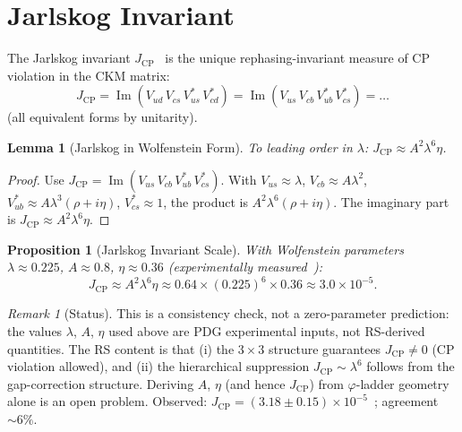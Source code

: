 \documentclass[12pt,a4paper]{article}
\newtheorem{lemma}[theorem]{Lemma}
\newtheorem{proposition}[theorem]{Proposition}
\theoremstyle{definition}
\theoremstyle{remark}
\newtheorem{remark}[theorem]{Remark}
\begin{document}
\section{Jarlskog Invariant}
\label{sec:jarlskog}

The Jarlskog invariant $J_{\mathrm{CP}}$~\cite{Jarlskog1985} is the
unique rephasing-invariant measure of CP violation in the CKM matrix:
\begin{equation}
  J_{\mathrm{CP}} = \operatorname{Im}(V_{ud}\,V_{cs}\,V_{us}^*\,V_{cd}^*)
  = \operatorname{Im}(V_{us}\,V_{cb}\,V_{ub}^*\,V_{cs}^*)
  = \dots
\end{equation}
(all equivalent forms by unitarity).

\begin{lemma}[Jarlskog in Wolfenstein Form]
\label{lem:jarlskog-wolf}
To leading order in $\lambda$:
$J_{\mathrm{CP}} \approx A^2 \lambda^6 \eta$.
\end{lemma}

\begin{proof}
Use $J_{\mathrm{CP}} = \operatorname{Im}(V_{us}\,V_{cb}\,V_{ub}^*\,V_{cs}^*)$.
With $V_{us} \approx \lambda$, $V_{cb} \approx A\lambda^2$,
$V_{ub}^* \approx A\lambda^3(\rho + i\eta)$, $V_{cs}^* \approx 1$,
the product is $A^2\lambda^6(\rho + i\eta)$.  The imaginary part is
$J_{\mathrm{CP}} \approx A^2 \lambda^6 \eta$.
\end{proof}

\begin{proposition}[Jarlskog Invariant Scale]
\label{prop:jarlskog}
With Wolfenstein parameters $\lambda \approx 0.225$, $A \approx 0.8$,
$\eta \approx 0.36$ (experimentally measured~\cite{PDG2024}):
\begin{equation}
  J_{\mathrm{CP}} \approx A^2 \lambda^6 \eta
  \approx 0.64 \times (0.225)^6 \times 0.36 \approx 3.0 \times 10^{-5}.
\end{equation}
\end{proposition}

\begin{remark}[Status]
This is a consistency check, not a zero-parameter prediction: the
values $\lambda$, $A$, $\eta$ used above are PDG experimental inputs,
not RS-derived quantities.  The RS content is that (i) the $3 \times 3$
structure guarantees $J_{\mathrm{CP}} \neq 0$ (CP violation allowed),
and (ii) the hierarchical suppression $J_{\mathrm{CP}} \sim \lambda^6$
follows from the gap-correction structure.  Deriving $A$, $\eta$ (and
hence $J_{\mathrm{CP}}$) from $\varphi$-ladder geometry alone is an
open problem. Observed:
$J_{\mathrm{CP}} = (3.18 \pm 0.15) \times 10^{-5}$~\cite{PDG2024};
agreement $\sim 6\%$.
\end{remark}
\end{document}

